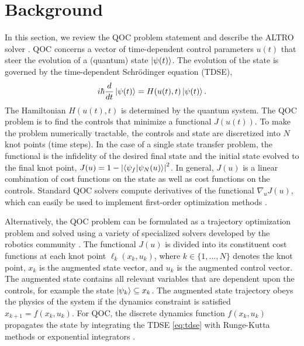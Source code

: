 \section{Background \label{sec:background}}
In this section, we
review the QOC problem statement
and describe the ALTRO solver \cite{howell2019altro}.
QOC concerns a vector of time-dependent control parameters $u(t)$
that steer the evolution of a (quantum) state $\ket{\psi(t)}$.
The evolution of the state is governed by the time-dependent
Schr{\"o}dinger equation (TDSE),
\begin{equation}
  i \hbar \frac{d}{dt} \ket{\psi(t)} = H(u(t), t) \ket{\psi(t)}.
  \label{eq:tdse}
\end{equation}
The Hamiltonian $H(u(t), t)$ is determined by the quantum system.
The QOC problem is to find the
controls that minimize a functional $J(u(t))$.
To make the problem numerically tractable,
the controls and state are discretized into $N$ knot points (time steps).
In the case of a single state transfer problem, the functional is
the infidelity of the desired final state and the initial state evolved
to the final knot point,
$J(u) = 1 - {\lvert \braket{\psi_{f}}{\psi_{N}(u)} \rvert}^{2}$.
In general, $J(u)$ is a linear combination of cost functions on the state
as well as cost functions on the controls.
Standard QOC solvers compute derivatives of the functional $\nabla_{u} J(u)$,
which can easily be used to implement first-order optimization methods
\cite{machnes2015tunable, khaneja2005optimal, leung2017speedup, goerz2019krotov}.

Alternatively, the QOC problem can be formulated as a trajectory optimization problem 
and solved using a variety of specialized solvers developed by the robotics community
\cite{Schulman13, Tedrake16, Hereid2017FROST, howell2019altro}.
The functional $J(u)$ is divided into its constituent
cost functions at each knot point $\ell_{k}(x_{k}, u_{k})$,
where $k \in \{1, ..., N\}$ denotes the knot point,
$x_{k}$ is the augmented state vector,
and $u_{k}$ is the augmented control vector.
The augmented state contains all relevant variables
that are dependent upon the controls, for example the state
$\ket{\psi_{k}} \subseteq x_{k}$.
The augmented state trajectory obeys the physics of the system if
the dynamics constraint is satisfied
$x_{k + 1} = f(x_{k}, u_{k})$. For QOC, the discrete
dynamics function $f(x_{k}, u_{k})$ propagates the state by
integrating the TDSE \ref{eq:tdse} with Runge-Kutta methods \cite{jorgensen2011numerical}
or exponential integrators \cite{auer2018magnus, berland2005solving, einkemmer2017performance,
shillito2020fast}.

